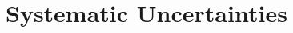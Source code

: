 \documentclass[edeposit,fullpage]{uiucthesis2009}
\begin{document}
\chapter{Systematic Uncertainties}

\end{document}
